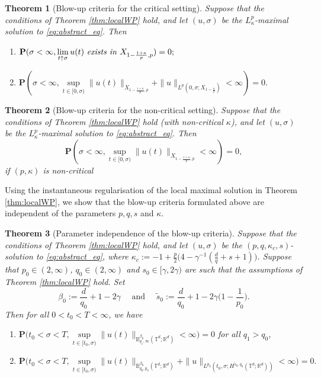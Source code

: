 \documentclass[11pt, a4paper,oneside, reqno]{amsart}
\newtheorem{theorem}{Theorem}
\theoremstyle{remark} %
\theoremstyle{definition} %
\numberwithin{theorem}{section}
\numberwithin{equation}{section}
\newcommand{\T}{\mathbb{T}}
\newcommand{\RR}{\mathbb{R}}
\newcommand{\BB}{\mathbb{B}}
\newcommand{\gam}{\gamma}
\renewcommand{\tilde}[1]{\widetilde{#1}}
\begin{document}
\begin{theorem}[Blow-up criteria for the critical setting]\label{thm:blow-up_crit_critical}
Suppose that the conditions of Theorem \ref{thm:localWP} hold, and let $(u, \sigma)$ be the $L^p_\kappa$-maximal solution to \eqref{eq:abstract_eq}. Then
\begin{enumerate}
    \item[(1)] $\mathbf{P}(\sigma < \infty, \lim\limits_{t \uparrow \sigma} u(t) \text{ \textit{exists in} } X_{1 - \frac{1+\kappa}{p}, p}) = 0;$
    \item[(2)] $\mathbf{P}(\sigma < \infty, \sup\limits_{t \in [0, \sigma)} \|u(t)\|_{X_{1 - \frac{1+\kappa}{p}, p}} + \|u\|_{L^p(0, \sigma; X_{1 - \frac{\kappa}{p}})} < \infty) = 0.$
\end{enumerate}
\end{theorem} 

\begin{theorem}[Blow-up criteria for the non-critical setting]\label{thm:blow-up_crit_noncritical}
Suppose that the conditions of Theorem \ref{thm:localWP} hold (with non-critical $\kappa$), and let $(u, \sigma)$ be the $L^p_\kappa$-maximal solution to \eqref{eq:abstract_eq}. Then
\begin{equation*}
    \mathbf{P}(\sigma < \infty,\sup\limits_{t \in [0, \sigma)} \|u(t)\|_{X_{1 - \frac{1+\kappa}{p}, p}}<\infty) = 0,
\end{equation*}
if $(p,\kappa)$ is non-critical

\end{theorem} 


Using the instantaneous regularisation of the local maximal solution in Theorem \ref{thm:localWP}, we show that the blow-up criteria formulated above are independent of the parameters $p,q, s$ and $\kappa$.  
\begin{theorem}[Parameter independence of the blow-up criteria]\label{thm:indep_parameter_blow-up}
Suppose that the conditions of Theorem \ref{thm:localWP} hold, and let $(u, \sigma)$ be the $(p,q,\kappa_c, s)$-solution to \eqref{eq:abstract_eq}, where $\kappa_c:=-1 + \frac{p}{2}\big(4-\gam^{-1}(\frac{d}{q}+s+1)\big)$. Suppose that $p_0\in (2,\infty)$, $q_0\in (2,\infty)$ and $s_0\in [\gam, 2\gam)$ are such that the assumptions of Theorem \ref{thm:localWP} hold. Set
\begin{equation*}
    \beta_0:=\frac{d}{q_0}+1-2\gam\quad \text{ and }\quad \tilde{s}_0:=\frac{d}{q_0}+1-2\gam\Big(1-\frac{1}{p_0}\Big).
\end{equation*}
Then for all $0<t_0<T<\infty$, we have
\begin{enumerate}[(1)]
    \item\label{it:1} $\mathbf{P}\big(t_0<\sigma < T,\sup\limits_{t \in [t_0, \sigma)} \|u(t)\|_{{\BB^{\beta_0}_{q_1,\infty}(\T^d;\RR^d)}}<\infty\big) = 0$ for all $q_1> q_0$,
    \item\label{it:2} $\mathbf{P}\big(t_0<\sigma < T,\sup\limits_{t \in [t_0, \sigma)} \|u(t)\|_{{\BB^{\beta_0}_{q_0,p_0}(\T^d;\RR^d)}}+\|u\|_{L^{p_0}(t_0,\sigma; H^{\tilde{s}_0,q_0}(\T^d;\RR^d))}<\infty\big) = 0.$
\end{enumerate}
\end{theorem}
\end{document}
